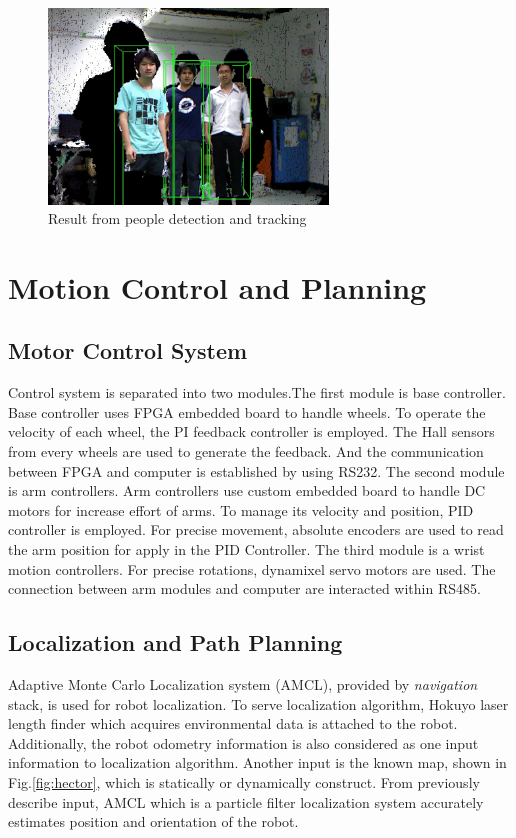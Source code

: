 \documentclass{llncs}
\begin{document}
\begin{figure}
\centering
\includegraphics[height=5.2cm]{people_detection_figure}
\caption{Result from people detection and tracking}
\label{fig:people_detection}
\end{figure}

\section{Motion Control and Planning}

\subsection{Motor Control System}

Control system is separated into two modules.The first module is base controller. Base controller uses FPGA embedded board to handle wheels. To operate the velocity of each wheel, the PI feedback controller is employed. The Hall sensors from every wheels are used to generate the feedback. And the communication between FPGA and computer is established by using RS232. The second module is arm controllers. Arm controllers use custom embedded board to handle DC motors for increase effort of arms. To manage its velocity and position, PID controller is employed. For precise movement, absolute encoders are used to read the arm position for apply in the PID Controller. The third module is a wrist motion controllers. For precise rotations, dynamixel servo motors are used. The connection between arm modules and computer are interacted within RS485.

\subsection{Localization and Path Planning}

Adaptive Monte Carlo Localization system (AMCL), provided by \textit{navigation} stack, is used for robot localization. To serve localization algorithm, Hokuyo laser length finder which acquires environmental data is attached to the robot. Additionally, the robot odometry information is also considered as one input information to localization algorithm. Another input is the known map, shown in Fig.\ref{fig:hector}, which is statically or dynamically construct. From previously describe input, AMCL which is a particle filter localization system accurately estimates position and orientation of the robot.
\end{document}
